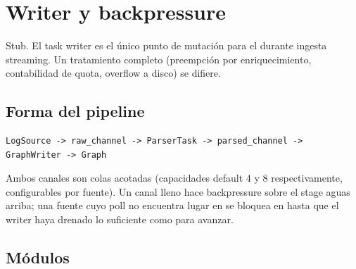 \chapter{Writer y backpressure}
\label{ch:writer}

\begin{note}
Stub. El task writer es el único punto de mutación para el
\Graph{} durante ingesta streaming. Un tratamiento completo
(preempción por enriquecimiento, contabilidad de quota,
overflow a disco) se difiere.
\end{note}

\section{Forma del pipeline}

\begin{verbatim}
LogSource -> raw_channel -> ParserTask -> parsed_channel -> GraphWriter -> Graph
\end{verbatim}

Ambos canales son colas  acotadas
(capacidades default 4 y 8 respectivamente, configurables por
fuente). Un canal lleno hace backpressure sobre el stage
aguas arriba; una fuente cuyo poll no encuentra lugar en
 se bloquea en  hasta que
el writer haya drenado lo suficiente como para avanzar.

\section{Módulos}

